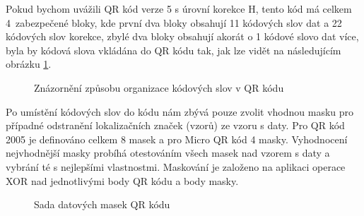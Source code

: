 Pokud bychom uvážili QR kód verze 5 s úrovní korekce H, 
tento kód má celkem 4~zabezpečené bloky, kde první dva bloky obsahují 11 
kódových slov dat a 22 kódových slov korekce, zbylé dva bloky obsahují akorát 
o 1 kódové slovo dat více, byla by kódová slova vkládána do QR kódu tak, jak 
lze vidět na následujícím obrázku \ref{PuttingDataCodewordsIntoQRCode}.

\begin{figure}[H]
  \begin{center}
    \caption{Znázornění způsobu organizace kódových slov v QR kódu}
    \label{PuttingDataCodewordsIntoQRCode}
  \end{center}
\end{figure}

Po umístění kódových slov do kódu nám zbývá pouze zvolit vhodnou masku pro
případné odstranění lokalizačních značek (vzorů) ze vzoru s daty. Pro QR kód
2005 je definováno celkem 8 masek a pro Micro QR kód 4 masky. Vyhodnocení
nejvhodnější masky probíhá otestováním všech masek nad vzorem s daty a vybrání
té s nejlepšími vlastnostmi. Maskování je založeno na aplikaci operace XOR nad
jednotlivými body QR kódu a body masky.

\begin{figure}[H]
  \begin{center}
    \caption{Sada datových masek QR kódu}
    \label{QRCodeDataMasks}
  \end{center}
\end{figure}

